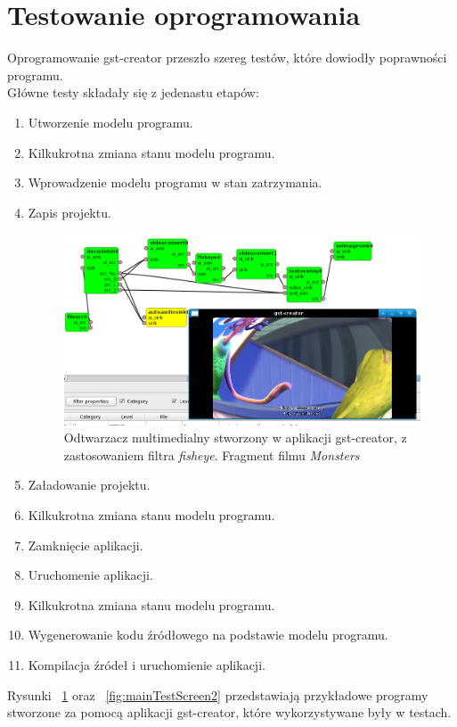 \documentclass[12pt]{article}
\begin{document}
\section{Testowanie oprogramowania}
Oprogramowanie gst-creator przeszło szereg testów, które dowiodły poprawności programu.\\
Główne testy składały się z jedenastu etapów:
\begin{enumerate}
  \setlength{\itemsep}{0em}
\item Utworzenie modelu programu.
\item Kilkukrotna zmiana stanu modelu programu.
\item Wprowadzenie modelu programu w stan zatrzymania.
\item Zapis projektu.
\begin{figure}[H]
  \includegraphics[width=160mm]{img/main-test-screen1.png}
  \caption{Odtwarzacz multimedialny stworzony w aplikacji gst-creator, z zastosowaniem filtra \textit{fisheye}. Fragment filmu \textit{Monsters} \cite{monstersDownloadPage}}
  \label{fig:mainTestScreen1}
\end{figure}
\item Załadowanie projektu. 
\item Kilkukrotna zmiana stanu modelu programu.
\item Zamknięcie aplikacji.
\item Uruchomenie aplikacji.
\item Kilkukrotna zmiana stanu modelu programu.
\item Wygenerowanie kodu źródłowego na podstawie modelu programu.
\item Kompilacja źródeł i uruchomienie aplikacji.
\end{enumerate}
Rysunki ~\ref{fig:mainTestScreen1} oraz ~\ref{fig:mainTestScreen2} przedstawiają przykładowe programy stworzone za pomocą aplikacji gst-creator, które wykorzystywane były w testach.
\end{document}
